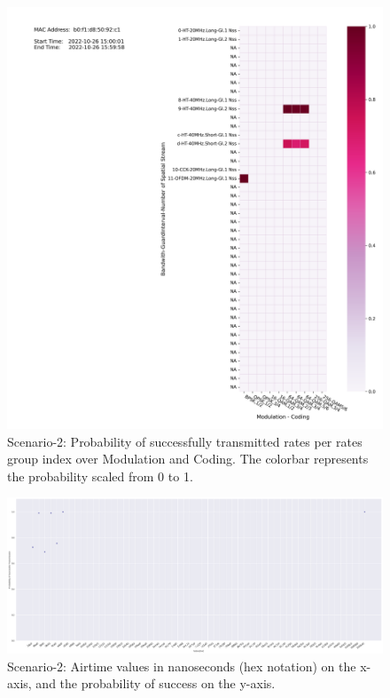 \begin{figure}[hbt!]
  \centering
  \includegraphics[width=\textwidth]{figures/plots/Scenario-2/G2-heatmap-p-b0:f1:d8:50:92:c1-22-431070-450182.png}
  \caption[Probability of Success for Rate-Based Transmission]{Scenario-2: Probability of successfully transmitted rates per rates group index over Modulation and Coding. The colorbar represents the probability scaled from 0 to 1.}
  \label{fig:Success-probability2}
\end{figure}
\FloatBarrier 

\begin{landscape}
\begin{figure}[hbt!]
  \centering
  \includegraphics[width=1.45\textwidth, height=\textheight, keepaspectratio]{figures/plots/Scenario-2/G2-probability vs airtime-b0:f1:d8:50:92:c1-22-431070-450182.png}
  \caption[Airtime-Based Success Probability for Rate-Based Transmission]{Scenario-2: Airtime values in nanoseconds (hex notation) on the x-axis, and the probability of success on the y-axis.}
  \label{fig:Success-p-vs-airtime2}
\end{figure}
\FloatBarrier 
\end{landscape}

